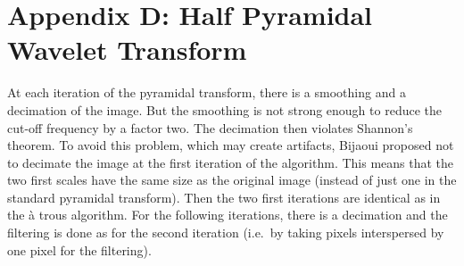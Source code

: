 \chapter*{Appendix D: Half Pyramidal Wavelet Transform}

At each iteration of the pyramidal transform, there is a smoothing and 
a decimation of the image. But the smoothing is not strong enough to
reduce the cut-off frequency by a factor two. The decimation then violates
Shannon's theorem. To avoid this problem, which may create artifacts, 
Bijaoui \cite{wave:bijaoui97}
proposed not to decimate the image at the first iteration of the algorithm.
This means that the two first scales have the same size as the original image
(instead of just one in the standard pyramidal transform). Then the two first
iterations are identical as in the \`a trous algorithm. For the
following iterations, there is a decimation and the filtering is done
as for the second iteration (i.e.\ by taking pixels interspersed by 
one pixel for the filtering).

\newpage
$ $


